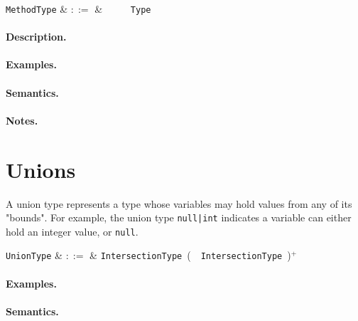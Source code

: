\begin{syntax}
  \verb+MethodType+ & $::=$ & \ \token{(}\
  \ \token{)}\ \token{=>}\ \verb+Type+\\
\end{syntax}

\paragraph{Description.}  

\paragraph{Examples.}

\paragraph{Semantics.}

\paragraph{Notes.}


\section{Unions}

A union type represents a type whose variables may hold values from any of its "bounds". For example, the union type \lstinline{null|int} indicates a variable can either hold an integer value, or \lstinline{null}. 

\begin{syntax}
  \verb+UnionType+ & $::=$ & \verb+IntersectionType+\ \big(\ \token{|}\ \verb+IntersectionType+\
  \big)$^+$\\
\end{syntax}

\paragraph{Examples.}

\paragraph{Semantics.}

